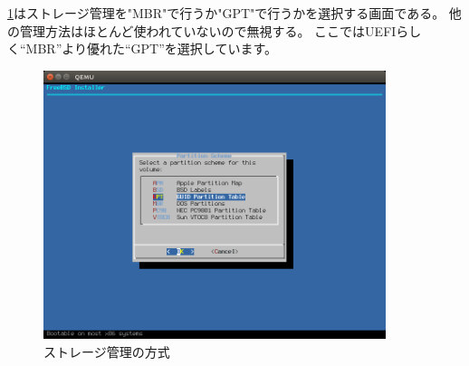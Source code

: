 \documentclass[a4j]{jarticle}
\begin{document}
\ref{fig:FreeBSD_GPT}はストレージ管理を"MBR"で行うか"GPT"で行うかを選択する画面である。
他の管理方法はほとんど使われていないので無視する。
ここではUEFIらしく``MBR''より優れた``GPT''を選択しています。
\begin{figure}[htbp]
	\centering
	\includegraphics[width=10cm]{./IMG/FreeBSD_GPT.png}
    \caption{ストレージ管理の方式}
    \label{fig:FreeBSD_GPT}
\end{figure}
\end{document}
